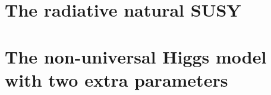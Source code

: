  


\section{}
\label{sec:susy_}


\section{The radiative natural SUSY}
\label{sec:susy_rns}


\section{The non-universal Higgs model with two extra parameters}
\label{sec:susy_nuhm2}